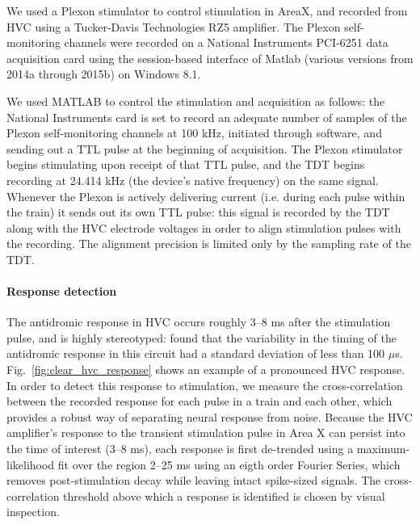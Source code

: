 \documentclass[10pt,letterpaper]{article}
\newcommand\fig[1]{Fig.~\ref{#1}}
\let\oldmarginpar\marginpar
\renewcommand{\marginpar}[1]{\oldmarginpar{\linespread{1}\scriptsize{#1}}}
\renewcommand{\subsubsection}[1]{\paragraph{#1}}
\begin{document}
We used a Plexon stimulator to control stimulation in AreaX, and recorded from HVC using a Tucker-Davis Technologies RZ5 amplifier.  The Plexon self-monitoring channels were recorded on a National Instruments PCI-6251 data acquisition card using the session-based interface of Matlab (various versions from 2014a through 2015b) on Windows 8.1.

We used MATLAB to control the stimulation and acquisition as follows: the National Instruments card is set to record an adequate number of samples of the Plexon self-monitoring channels at 100 kHz, initiated through software, and sending out a TTL pulse at the beginning of acquisition.  The Plexon stimulator begins stimulating upon receipt of that TTL pulse, and the TDT begins recording at 24.414 kHz (the device's native frequency) on the same signal.  Whenever the Plexon is actively delivering current (i.e. during each pulse within the train) it sends out its own TTL pulse: this signal is recorded by the TDT along with the HVC electrode voltages in order to align stimulation pulses with the recording.  The alignment precision is limited only by the sampling rate of the TDT.

\subsubsection{Response detection}

The antidromic response in HVC occurs roughly 3--8 ms after the stimulation pulse\marginpar{Citation}, and is highly stereotyped: \cite{Hahnloser2002sparse} found that the variability in the timing of the antidromic response in this circuit had a standard deviation of less than 100 $\mu$s.  \fig{fig:clear_hvc_response} shows an example of a pronounced HVC response.  In order to detect this response to stimulation, we measure the cross-correlation between the recorded response for each pulse in a train and each other, which provides a robust way of separating neural response from noise.  Because the HVC amplifier's response to the transient stimulation pulse in Area X can persist into the time of interest (3--8 ms), each response is first de-trended using a maximum-likelihood fit over the region 2--25 ms using an eigth order Fourier Series, which removes post-stimulation decay while leaving intact spike-sized signals.  The cross-correlation threshold above which a response is identified is chosen by visual inspection.
\end{document}

